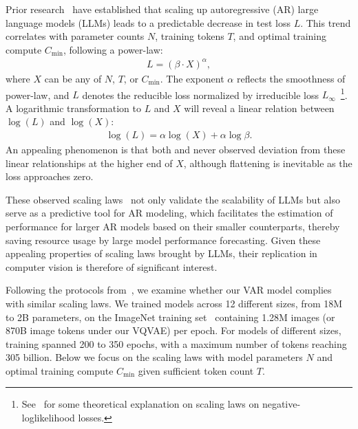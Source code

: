 Prior research~\cite{scalinglaw,scalingar,chinchilla,gpt4} have established that scaling up autoregressive (AR) large language models (LLMs) leads to a predictable decrease in test loss $L$.
This trend correlates with parameter counts $N$, training tokens $T$, and optimal training compute $C_\text{min}$, following a power-law:\vspace{1pt}
\begin{align}
    L = (\beta \cdot X)^{\alpha},
\end{align}
where $X$ can be any of $N$, $T$, or $C_\text{min}$.
The exponent $\alpha$ reflects the smoothness of power-law, and $L$ denotes the reducible loss normalized by irreducible loss $L_{\infty}$~\cite{scalingar}\footnote{See~\cite{scalingar} for some theoretical explanation on scaling laws on negative-loglikelihood losses.}.
A logarithmic transformation to $L$ and $X$ will reveal a linear relation between $\log(L)$ and $\log(X)$:\vspace{1pt}
\begin{align}
    \log(L) = \alpha \log (X) + \alpha \log\beta.
\end{align}
An appealing phenomenon is that both \cite{scalinglaw} and \cite{scalingar} never observed deviation from these linear relationships at the higher end of $X$, although flattening is inevitable as the loss approaches zero.

These observed scaling laws~\cite{scalinglaw,scalingar,chinchilla,gpt4} not only validate the scalability of LLMs but also serve as a predictive tool for AR modeling, which facilitates the estimation of performance for larger AR models based on their smaller counterparts, thereby saving resource usage by large model performance forecasting.
Given these appealing properties of scaling laws brought by LLMs, their replication in computer vision is therefore of significant interest.


\vspace{4pt}
Following the protocols from~\cite{scalinglaw,scalingar,chinchilla,gpt4}, we examine whether our VAR model complies with similar scaling laws.
We trained models across 12 different sizes, from 18M to 2B parameters, on the ImageNet training set~\cite{imagenet} containing 1.28M images (or 870B image tokens under our VQVAE) per epoch.
For models of different sizes, training spanned 200 to 350 epochs, with a maximum number of tokens reaching 305 billion.
Below we focus on the scaling laws with model parameters $N$ and optimal training compute $C_\text{min}$ given sufficient token count $T$.


